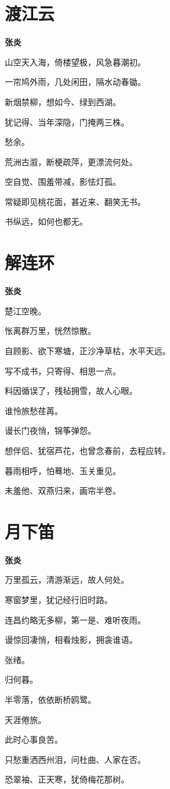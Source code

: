\documentclass[12pt,a4paper]{ctexbook}
\begin{document}
\section{渡江云}
\textbf{张炎}\par\vspace{0.5em}
山空天入海，倚楼望极，风急暮潮初。\par
一帘鸠外雨，几处闲田，隔水动春锄。\par
新烟禁柳，想如今、绿到西湖。\par
犹记得、当年深隐，门掩两三株。\par
愁余。\par
荒洲古溆，断梗疏萍，更漂流何处。\par
空自觉、围羞带减，影怯灯孤。\par
常疑即见桃花面，甚近来、翻笑无书。\par
书纵远，如何也都无。\par

\section{解连环}
\textbf{张炎}\par\vspace{0.5em}
楚江空晚。\par
怅离群万里，恍然惊散。\par
自顾影、欲下寒塘，正沙净草枯，水平天远。\par
写不成书，只寄得、相思一点。\par
料因循误了，残毡拥雪，故人心眼。\par
谁怜旅愁荏苒。\par
谩长门夜悄，锦筝弹怨。\par
想伴侣、犹宿芦花，也曾念春前，去程应转。\par
暮雨相呼，怕蓦地、玉关重见。\par
未羞他、双燕归来，画帘半卷。\par

\section{月下笛}
\textbf{张炎}\par\vspace{0.5em}
万里孤云，清游渐远，故人何处。\par
寒窗梦里，犹记经行旧时路。\par
连昌约略无多柳，第一是、难听夜雨。\par
谩惊回凄悄，相看烛影，拥衾谁语。\par
张绪。\par
归何暮。\par
半零落，依依断桥鸥鹭。\par
天涯倦旅。\par
此时心事良苦。\par
只愁重洒西州泪，问杜曲、人家在否。\par
恐翠袖、正天寒，犹倚梅花那树。\par
\end{document}
